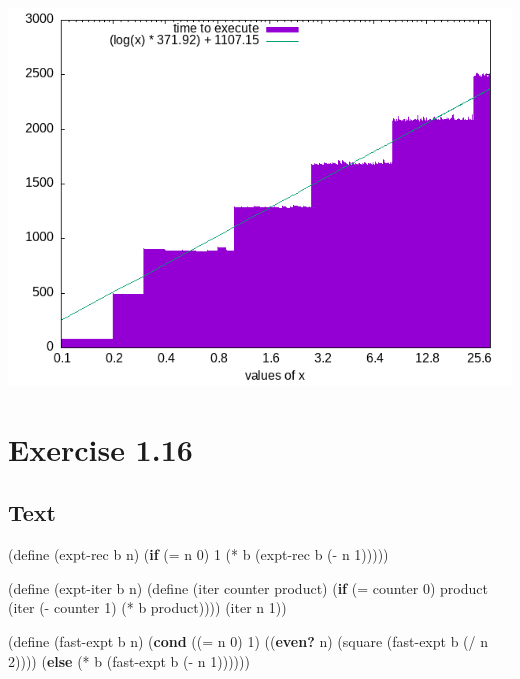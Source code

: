 \documentclass[
]{article}
\newenvironment{Shaded}{}{}
\newcommand{\DecValTok}[1]{\textcolor[rgb]{0.25,0.63,0.44}{#1}}
\newcommand{\ExtensionTok}[1]{#1}
\newcommand{\FunctionTok}[1]{\textcolor[rgb]{0.02,0.16,0.49}{#1}}
\newcommand{\KeywordTok}[1]{\textcolor[rgb]{0.00,0.44,0.13}{\textbf{#1}}}
\newcommand{\NormalTok}[1]{#1}
\newcommand{\OperatorTok}[1]{\textcolor[rgb]{0.40,0.40,0.40}{#1}}
\begin{document}
\includegraphics{fig/1-15-bench.png}

\hypertarget{exercise-1.16}{%
\section{Exercise 1.16}\label{exercise-1.16}}

\hypertarget{text-2}{%
\subsection{Text}\label{text-2}}

\hypertarget{txt-expt}{%
\label{txt-expt}}%
\begin{Shaded}
\begin{Highlighting}[numbers=left,,]
\NormalTok{(}\ExtensionTok{define}\FunctionTok{ }\NormalTok{(expt{-}rec b n)}
\NormalTok{  (}\KeywordTok{if}\NormalTok{ (}\OperatorTok{=}\NormalTok{ n }\DecValTok{0}\NormalTok{) }
      \DecValTok{1} 
\NormalTok{      (}\OperatorTok{*}\NormalTok{ b (expt{-}rec b (}\OperatorTok{{-}}\NormalTok{ n }\DecValTok{1}\NormalTok{)))))}

\NormalTok{(}\ExtensionTok{define}\FunctionTok{ }\NormalTok{(expt{-}iter b n) }
\NormalTok{  (}\ExtensionTok{define}\FunctionTok{ }\NormalTok{(iter counter product)}
\NormalTok{    (}\KeywordTok{if}\NormalTok{ (}\OperatorTok{=}\NormalTok{ counter }\DecValTok{0}\NormalTok{)}
\NormalTok{        product}
\NormalTok{        (iter (}\OperatorTok{{-}}\NormalTok{ counter }\DecValTok{1}\NormalTok{)}
\NormalTok{              (}\OperatorTok{*}\NormalTok{ b product))))}
\NormalTok{  (iter n }\DecValTok{1}\NormalTok{))}

\NormalTok{(}\ExtensionTok{define}\FunctionTok{ }\NormalTok{(fast{-}expt b n)}
\NormalTok{  (}\KeywordTok{cond}\NormalTok{ ((}\OperatorTok{=}\NormalTok{ n }\DecValTok{0}\NormalTok{) }
         \DecValTok{1}\NormalTok{)}
\NormalTok{        ((}\KeywordTok{even?}\NormalTok{ n) }
\NormalTok{         (square (fast{-}expt b (}\OperatorTok{/}\NormalTok{ n }\DecValTok{2}\NormalTok{))))}
\NormalTok{        (}\KeywordTok{else} 
\NormalTok{         (}\OperatorTok{*}\NormalTok{ b (fast{-}expt b (}\OperatorTok{{-}}\NormalTok{ n }\DecValTok{1}\NormalTok{))))))}
\end{Highlighting}
\end{Shaded}
\end{document}
